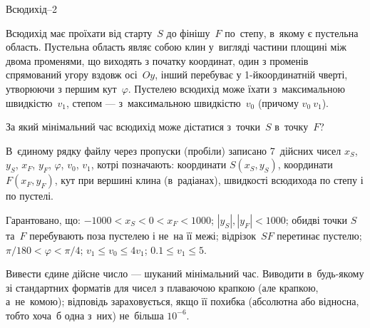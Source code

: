 ﻿\begin{problemAllDefault}{Всюдихід--2}

Всюдихід має проїхати від старту~$S$ до фінішу~$F$ по~степу, в~якому є пустельна область. Пустельна область являє собою клин у~вигляді частини площині між двома променями, що виходять з початку координат, один з променів спрямований угору вздовж осі~$Oy$, інший перебуває у \mbox{1-й}\nolinebreak[3] координатній чверті, утворюючи з першим кут~$\varphi$. Пустелею всюдихід може їхати з~максимальною швидкістю~$v_1$, степом --- з~максимальною швидкістю~$v_0$ (причому $v_0{\>}v_1$).

За який мінімальний час всюдихід може дістатися з~точки~$S$ в~точку~$F$?

\InputFile
В~єдиному рядку файлу через пропуски (пробіли) записано 7~дійсних чисел $x_S$, $y_S$, $x_F$, $y_F$, $\varphi$, $v_0$, $v_1$, котрі позначають: координати $S(x_S,y_S)$, координати $F(x_F,y_F)$, кут при вершині клина (в~радіанах), швидкості всюдихода по степу і по пустелі. 

Гарантовано, що: $-1000 < x_S < 0 < x_F < 1000$; $|y_S|, |y_F| < 1000$; обидві точки $S$ та~$F$ перебувають поза пустелею і не~на її межі; відрізок~$SF$ перетинає пустелю;
$\pi/180  <  \varphi  <  \pi/4$;
$v_1 \leqslant v_0 \leqslant 4v_1$;
$0.1 \leqslant v_1 \leqslant 5$.

\OutputFile
Вивести єдине дійсне число --- шуканий мінімальний час. Виводити в~будь-якому зі стандартних форматів для чисел з плаваючою крапкою (але крапкою, а~не~комою); відповідь зараховується, якщо її похибка (абсолютна або відносна, тобто хоча~б одна з~них) не~більша $10^{-6}$.

\Example

\begin{examplewide}
%
\end{examplewide}

\end{problemAllDefault}

